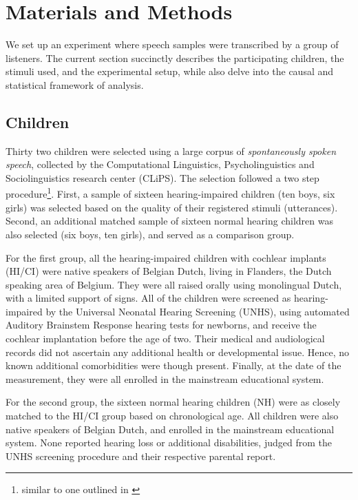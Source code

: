 \section{Materials and Methods} \label{S:materials_methods}
%
We set up an experiment where speech samples were transcribed by a group of listeners. The current section succinctly describes the participating children, the stimuli used, and the experimental setup, while also delve into the causal and statistical framework of analysis.
%
%
\subsection{Children} \label{sS:children}
%
Thirty two children were selected using a large corpus of \textit{spontaneously spoken speech}, collected by the Computational Linguistics, Psycholinguistics and Sociolinguistics research center (CLiPS). The selection followed a two step procedure\footnote{similar to one outlined in \citet{Faes_et_al_2021}}. First, a sample of sixteen hearing-impaired children (ten boys, six girls) was selected based on the quality of their registered stimuli (utterances). Second, an additional matched sample of sixteen normal hearing children was also selected (six boys, ten girls), and served as a comparison group.

For the first group, all the hearing-impaired children with cochlear implants (HI/CI) were native speakers of Belgian Dutch, living in Flanders, the Dutch speaking area of Belgium. They were all raised orally using monolingual Dutch, with a limited support of signs. All of the children were screened as hearing-impaired by the Universal Neonatal Hearing Screening (UNHS), using automated Auditory Brainstem Response hearing tests for newborns, and receive the cochlear implantation before the age of two. Their medical and audiological records did not ascertain any additional health or developmental issue. Hence, no known additional comorbidities were though present. Finally, at the date of the measurement, they were all enrolled in the mainstream educational system.

For the second group, the sixteen normal hearing children (NH) were as closely matched to the HI/CI group based on chronological age. All children were also native speakers of Belgian Dutch, and enrolled in the mainstream educational system. None reported hearing loss or additional disabilities, judged from the UNHS screening procedure and their respective parental report.

